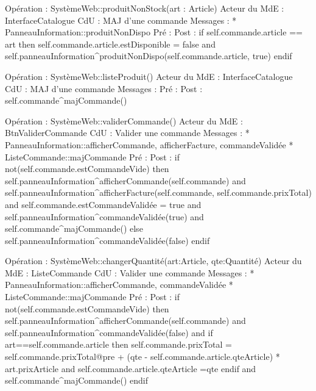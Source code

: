 Opération : SystèmeWeb::produitNonStock(art : Article)
Acteur du MdE : InterfaceCatalogue
CdU : MAJ d’une commande
Messages :
* PanneauInformation::{produitNonDispo} 
Pré :
Post :  
        if self.commande.article == art then
                self.commande.article.estDisponible = false 
                and
                self.panneauInformation^produitNonDispo(self.commande.article, true)
        endif



Opération : SystèmeWeb::listeProduit()
Acteur du MdE : InterfaceCatalogue
CdU : MAJ d’une commande
Messages :
Pré :
Post :  self.commande^majCommande()



Opération : SystèmeWeb::validerCommande()
Acteur du MdE : BtnValiderCommande
CdU : Valider une commande
Messages : 
* PanneauInformation::{afficherCommande, afficherFacture, commandeValidée}
* ListeCommande::{majCommande}
Pré :
Post :  
        if not(self.commande.estCommandeVide) then
                self.panneauInformation^afficherCommande(self.commande) 
                and
                self.panneauInformation^afficherFacture(self.commande, self.commande.prixTotal) 
                and
                self.commande.estCommandeValidée = true 
                and 
                self.panneauInformation^commandeValidée(true) 
                and
                self.commande^majCommande()
        else 
                self.panneauInformation^commandeValidée(false)
        endif




Opération : SystèmeWeb::changerQuantité(art:Article, qte:Quantité)
Acteur du MdE : ListeCommande  
CdU : Valider une commande
Messages : 
* PanneauInformation::{afficherCommande, commandeValidée}
* ListeCommande::{majCommande}
Pré :
Post :  
        if not(self.commande.estCommandeVide) then
                self.panneauInformation^afficherCommande(self.commande) 
                and
                self.panneauInformation^commandeValidée(false) 
                and
                if art==self.commande.article then
                        self.commande.prixTotal = self.commande.prixTotal@pre + 
                                (qte - self.commande.article.qteArticle) * art.prixArticle
                        and
                        self.commande.article.qteArticle =qte
                endif
                and 
                self.commande^majCommande()
        endif
                


